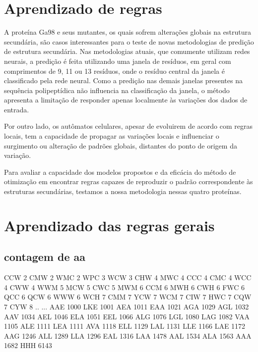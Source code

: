 \chapter{Aprendizado de regras}

A proteína Ga98 e seus mutantes, os quais sofrem alterações globais na estrutura secundária, são casos interessantes para o teste de novas metodologias de predição de estrutura secundária. Nas metodologias atuais, que comumente utilizam redes neurais, a predição é feita utilizando uma janela de resíduos, em geral com comprimentos de 9, 11 ou 13 resíduos, onde o resíduo central da janela é classificado pela rede neural. Como a predição nas demais janelas presentes na sequência polipeptídica não influencia na classificação da janela, o método apresenta a limitação de responder apenas localmente às variações dos dados de entrada.  

Por outro lado, os autômatos celulares, apesar de evoluirem de acordo com regras locais, tem a capacidade de propagar as variações locais e influenciar o surgimento ou alteração de padrões globais, distantes do ponto de origem da variação. 

Para avaliar a capacidade dos modelos propostos e da eficácia do método de otimização em encontrar regras capazes de reproduzir o padrão correspondente às estruturas secundárias, testamos a nossa metodologia nessas quatro proteínas.



\chapter{Aprendizado das regras gerais}




\section{contagem de aa}
CCW      2
CMW      2
WMC      2
WPC      3
WCW      3
CHW      4
MWC      4
CCC      4
CMC      4
WCC      4
CWW      4
WWM      5
MCW      5
CWC      5
MWM      6
CCM      6
MWH      6
CWH      6
FWC      6
QCC      6
QCW      6
WWW      6
WCH      7
CMM      7
YCW      7
WCM      7
CIW      7
HWC      7
CQW      7
CYW      8
..     ...
AAE   1000
LKE   1001
AEA   1011
EAA   1021
AGA   1029
AGL   1032
AAV   1034
AEL   1046
ELA   1051
EEL   1066
ALG   1076
LGL   1080
LAG   1082
VAA   1105
ALE   1111
LEA   1111
AVA   1118
ELL   1129
LAL   1131
LLE   1166
LAE   1172
AAG   1246
ALL   1289
LLA   1296
EAL   1316
LAA   1478
AAL   1534
ALA   1563
AAA   1682
HHH   6143